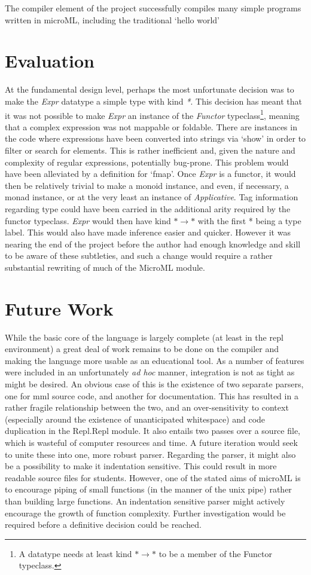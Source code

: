 \documentclass[12pt, a4paper]{report}
\begin{document}
The compiler element of the project successfully compiles many simple programs written in microML,
including the traditional `hello world'

\section{Evaluation}
At the fundamental design level, perhaps the most unfortunate decision was to make the \textit{Expr}
datatype a simple type with kind \textit{*}. This decision has meant that it was not possible to
make \textit{Expr} an instance of the \textit{Functor} typeclass\footnote{A datatype needs at least
kind $ * \rightarrow * $ to be a member of the Functor typeclass.}, meaning that a complex
expression was not mappable or foldable. There are instances in the code where expressions have been
converted into strings via `show' in order to filter or search for elements. This is rather
inefficient and, given the nature and complexity of regular expressions, potentially bug-prone. This
problem would have been alleviated by a definition for `fmap'. Once \textit{Expr} is a functor, it
would then be relatively trivial to make a monoid instance, and even, if necessary, a monad
instance, or at the very least an instance of \textit{Applicative}. Tag information regarding type
could have been carried in the additional arity required by the functor typeclass. \textit{Expr}
would then have kind $ * \rightarrow * $ with the first * being a type label. This would also have
made inference easier and quicker. However it was nearing the end of the project before the author
had enough knowledge and skill to be aware of these subtleties, and such a change would require a
rather substantial rewriting of much of the MicroML module.

\section{Future Work}
While the basic core of the language is largely complete (at least in the repl environment) a great
deal of work remains to be done on the compiler and making the language more usable as an educational
tool. As a number of features were included in an unfortunately \textit{ad hoc} manner, integration
is not as tight as might be desired. An obvious case of this is the existence of two separate
parsers, one for mml source code, and another for documentation. This has resulted in a rather
fragile relationship between the two, and an over-sensitivity to context (especially around the
existence of unanticipated whitespace) and code duplication in the Repl.Repl module. It also entails
two passes over a source file, which is wasteful of computer resources and time. A future iteration
would seek to unite these into one, more robust parser. Regarding the parser, it might also be a
possibility to make it indentation sensitive. This could result in more readable source files for
students. However, one of the stated aims of microML is to encourage piping of small functions (in
the manner of the unix pipe) rather than building large functions. An indentation sensitive parser
might actively encourage the growth of function complexity. Further investigation would be required
before a definitive decision could be reached.
\end{document}
